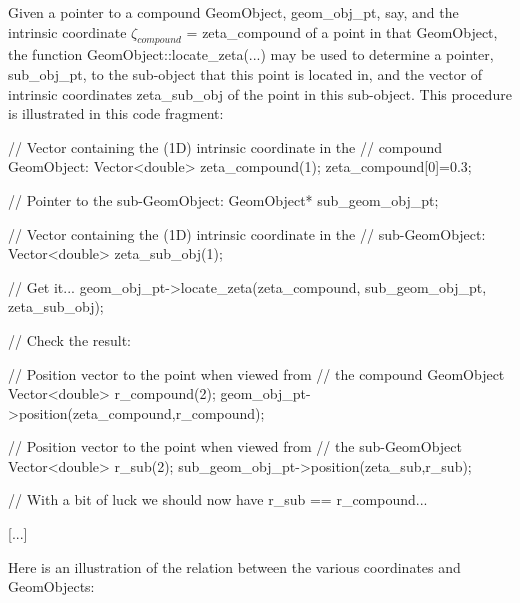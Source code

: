 Given a pointer to a compound {\ttfamily Geom\+Object}, {\ttfamily geom\+\_\+obj\+\_\+pt}, say, and the intrinsic coordinate $ \zeta_{compound} $ = {\ttfamily zeta\+\_\+compound} of a point in that {\ttfamily Geom\+Object}, the function {\ttfamily Geom\+Object\+::locate\+\_\+zeta}(...) may be used to determine a pointer, {\ttfamily sub\+\_\+obj\+\_\+pt}, to the sub-\/object that this point is located in, and the vector of intrinsic coordinates {\ttfamily zeta\+\_\+sub\+\_\+obj} of the point in this sub-\/object. This procedure is illustrated in this code fragment\+:


\begin{DoxyCode}
 [...] 

\textcolor{comment}{// Vector containing the (1D) intrinsic coordinate in the }
\textcolor{comment}{// compound GeomObject:}
Vector<double> zeta\_compound(1);
zeta\_compound[0]=0.3;

\textcolor{comment}{// Pointer to the sub-GeomObject:}
GeomObject* sub\_geom\_obj\_pt;

\textcolor{comment}{// Vector containing the (1D) intrinsic coordinate in the }
\textcolor{comment}{// sub-GeomObject:}
Vector<double> zeta\_sub\_obj(1);

\textcolor{comment}{// Get it...}
geom\_obj\_pt->locate\_zeta(zeta\_compound, sub\_geom\_obj\_pt, zeta\_sub\_obj);


\textcolor{comment}{// Check the result: }

\textcolor{comment}{// Position vector to the point when viewed from}
\textcolor{comment}{// the compound GeomObject}
Vector<double> r\_compound(2);
geom\_obj\_pt->position(zeta\_compound,r\_compound);

\textcolor{comment}{// Position vector to the point when viewed from}
\textcolor{comment}{// the sub-GeomObject}
Vector<double> r\_sub(2);
sub\_geom\_obj\_pt->position(zeta\_sub,r\_sub);

\textcolor{comment}{// With a bit of luck we should now have r\_sub == r\_compound...}

[...]
\end{DoxyCode}


Here is an illustration of the relation between the various coordinates and {\ttfamily Geom\+Objects\+:} 

